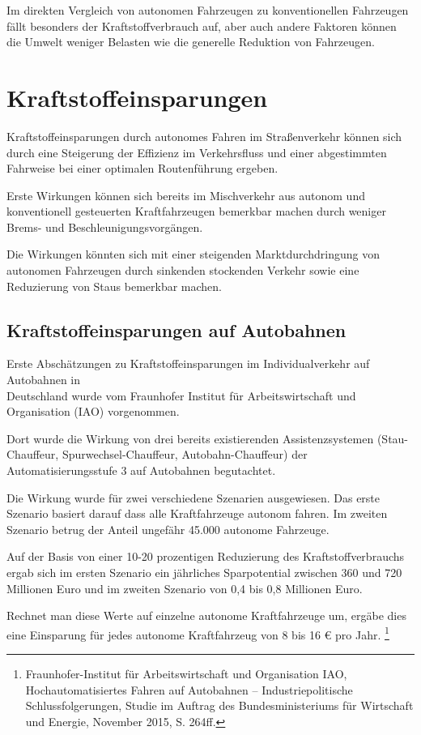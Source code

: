 Im direkten Vergleich von autonomen Fahrzeugen zu konventionellen Fahrzeugen fällt besonders der Kraftstoffverbrauch auf,
aber auch andere Faktoren können die Umwelt weniger Belasten wie die generelle Reduktion von Fahrzeugen.

\section{Kraftstoffeinsparungen}
Kraftstoffeinsparungen durch autonomes Fahren im Straßenverkehr können sich durch
eine Steigerung der Effizienz im Verkehrsfluss und
einer abgestimmten Fahrweise bei einer optimalen Routenführung ergeben.

Erste Wirkungen können sich bereits im Mischverkehr aus autonom und konventionell gesteuerten Kraftfahrzeugen bemerkbar machen durch weniger
Brems- und Beschleunigungsvorgängen.

Die Wirkungen könnten sich mit einer steigenden Marktdurchdringung von autonomen Fahrzeugen
durch sinkenden stockenden Verkehr sowie eine Reduzierung von Staus bemerkbar machen.

\subsection{Kraftstoffeinsparungen auf Autobahnen}
Erste Abschätzungen zu Kraftstoff\-einsparungen im Individualverkehr auf Autobahnen in\\
Deutschland wurde vom Fraunhofer
Institut für Arbeitswirtschaft und Organisation (IAO) vorgenommen.

Dort wurde die Wirkung von drei bereits existierenden Assistenzsystemen (Stau-Chauffeur, Spurwechsel-Chauffeur, Autobahn-Chauffeur)
der Automatisierungsstufe 3 auf Autobahnen begutachtet.

Die Wirkung wurde für zwei verschiedene Szenarien ausgewiesen.
Das erste Szenario basiert darauf dass alle Kraftfahrzeuge autonom fahren.
Im zweiten Szenario betrug der Anteil ungefähr 45.000 autonome Fahrzeuge.

Auf der Basis von einer 10-20 prozentigen Reduzierung des Kraftstoffverbrauchs ergab sich
im ersten Szenario ein jährliches Sparpotential zwischen 360 und 720 Millionen Euro und
im zweiten Szenario von 0,4 bis 0,8 Millionen Euro.

Rechnet man diese Werte auf einzelne autonome Kraftfahrzeuge um,
ergäbe dies eine Einsparung für jedes autonome Kraftfahrzeug von 8 bis 16 € pro Jahr.
\footnote{Fraunhofer-Institut für Arbeitswirtschaft und Organisation IAO, Hochautomatisiertes
	Fahren auf Autobahnen – Industriepolitische Schlussfolgerungen, Studie im Auftrag des
	Bundesministeriums für Wirtschaft und Energie, November 2015, S. 264ff.}

